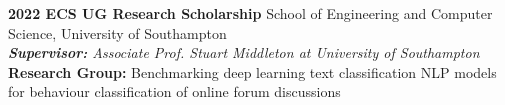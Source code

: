 \textbf{2022 ECS UG Research Scholarship} \hfill{School of Engineering and Computer Science, University of Southampton}\\
\textit{\textbf{Supervisor:}  Associate Prof. Stuart Middleton at University of Southampton}\\
\textbf{Research Group:} Benchmarking deep learning text classification NLP models for behaviour classification of online forum discussions